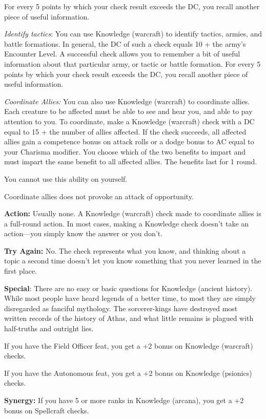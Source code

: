For every 5 points by which your check result exceeds the DC, you recall another piece of useful information.

\textit{Identify tactics}: You can use Knowledge (warcraft) to identify tactics, armies, and battle formations. In general, the DC of such a check equals 10 + the army's Encounter Level. A successful check allows you to remember a bit of useful information about that particular army, or tactic or battle formation. For every 5 points by which your check result exceeds the DC, you recall another piece of useful information.

\textit{Coordinate Allies:} You can also use Knowledge (warcraft) to coordinate allies. Each creature to be affected must be able to see and hear you, and able to pay attention to you. To coordinate, make a Knowledge (warcraft) check with a DC equal to 15 + the number of allies affected. If the check succeeds, all affected allies gain a competence bonus on attack rolls or a dodge bonus to AC equal to your Charisma modifier. You choose which
of the two benefits to impart and must impart the same benefit to all affected allies. The benefits last for 1 round.

You cannot use this ability on yourself.

Coordinate allies does not provoke an attack of opportunity.

\textbf{Action:} Usually none. A Knowledge (warcraft) check made to coordinate allies is a full-round action. In most cases, making a Knowledge check doesn't take an action---you simply know the answer or you don't.

\textbf{Try Again:} No. The check represents what you know, and thinking about a topic a second time doesn't let you know something that you never learned in the first place.

\textbf{Special}: There are no easy or basic questions for Knowledge (ancient history). While most people have heard legends of a better time, to most they are simply disregarded as fanciful mythology. The sorcerer-kings have destroyed most written records of the history of Athas, and what little remains is plagued with half-truths and outright lies.

If you have the Field Officer feat, you get a +2 bonus on Knowledge (warcraft) checks.

If you have the Autonomous feat, you get a +2 bonus on Knowledge (psionics) checks.

\textbf{Synergy:} If you have 5 or more ranks in Knowledge (arcana), you get a +2 bonus on Spellcraft checks.

